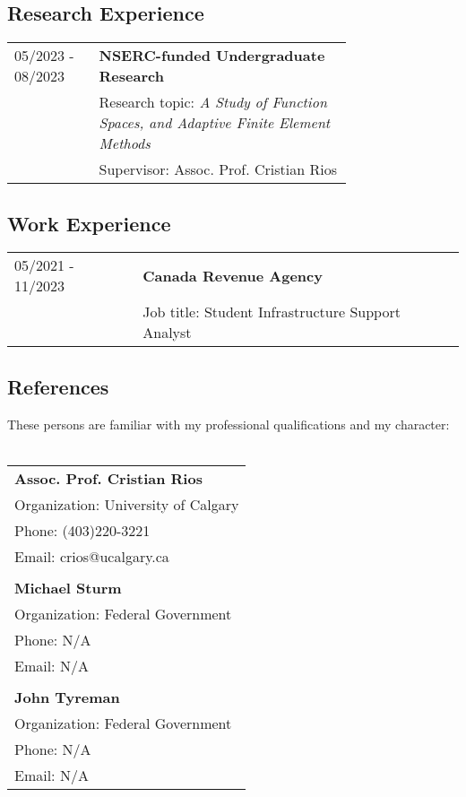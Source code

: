 \documentclass[12pt]{article}
\begin{document}
\subsection*{Research Experience}
\begin{tabular}{l p{0.75\linewidth}}
05/2023 - 08/2023&\textbf{NSERC-funded Undergraduate Research}\\
		      &Research topic: \textit{A Study of Function Spaces, and Adaptive Finite Element Methods}\\
		      &Supervisor: Assoc. Prof. Cristian Rios
\end{tabular}
\subsection*{Work Experience}
\begin{tabular}{l l}
05/2021 - 11/2023&\textbf{Canada Revenue Agency}\\
	            &Job title: Student Infrastructure Support Analyst
\end{tabular}
\newpage
\subsection*{References}
These persons are familiar with my professional qualifications and my character:\\
\\
\begin{tabular}{l}
	\textbf{Assoc. Prof. Cristian Rios}\\
	Organization: University of Calgary\\
	Phone: (403)220-3221\\
	Email: crios@ucalgary.ca\\
	\\
	\textbf{Michael Sturm}\\
	Organization: Federal Government\\
	Phone: N/A\\
	Email: N/A\\
	\\
	\textbf{John Tyreman}\\
	Organization: Federal Government\\
	Phone: N/A\\
	Email: N/A
\end{tabular}
\end{document}
